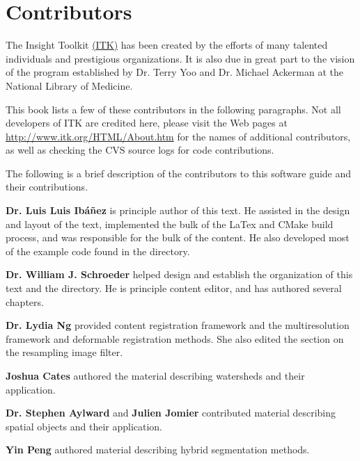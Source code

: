 \chapter*{Contributors}
\noindent

The Insight Toolkit \href{http://www.itk.org}{(ITK)} has been created by the
efforts of many talented individuals and prestigious organizations. It is also
due in great part to the vision of the program established by Dr. Terry Yoo
and Dr. Michael Ackerman at the National Library of Medicine.

This book lists a few of these contributors in the following paragraphs. Not
all developers of ITK are credited here, please visit the Web pages at
\href{http://www.itk.org/HTML/About.htm}{http://www.itk.org/HTML/About.htm} 
for the names of additional contributors, as well as checking the CVS source
logs for code contributions.

The following is a brief description of the contributors to this software
guide and their contributions.

{\bf Dr. Luis Luis Ib\'{a}\~{n}ez} is principle author of this text.
He assisted in the design and layout of the text, implemented the bulk of
the LaTex and CMake build process, and was responsible for the bulk of 
the content. He also developed most of the example code found in the
 directory.

{\bf Dr. William J. Schroeder} helped design and establish the organization 
of this text and the  directory. He is principle 
content editor, and has authored several chapters.

{\bf Dr. Lydia Ng} provided content registration framework and the
multiresolution framework and deformable registration methods. She also
edited the section on the resampling image filter.

{\bf Joshua Cates} authored the material describing watersheds and their
application.

{\bf Dr. Stephen Aylward} and {\bf Julien Jomier} contributed material 
describing spatial objects and their application.

{\bf Yin Peng} authored material describing hybrid segmentation methods. 

